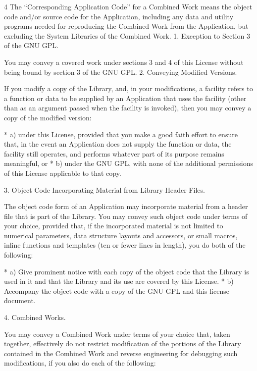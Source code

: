\documentclass[fontsize=11pt,paper=A4,BCOR=12mm,DIV=13,open=any,listof=totoc,toc=flat]{scrbook}
\begin{document}
{\begin{multicols}{4}
The “Corresponding Application Code” for a Combined Work means the object code and/or source code for the Application, including any data and utility programs needed for reproducing the Combined Work from the Application, but excluding the System Libraries of the Combined Work.
1. Exception to Section 3 of the GNU GPL.

You may convey a covered work under sections 3 and 4 of this License without being bound by section 3 of the GNU GPL.
2. Conveying Modified Versions.

If you modify a copy of the Library, and, in your modifications, a facility refers to a function or data to be supplied by an Application that uses the facility (other than as an argument passed when the facility is invoked), then you may convey a copy of the modified version:

    * a) under this License, provided that you make a good faith effort to ensure that, in the event an Application does not supply the function or data, the facility still operates, and performs whatever part of its purpose remains meaningful, or
    * b) under the GNU GPL, with none of the additional permissions of this License applicable to that copy.

3. Object Code Incorporating Material from Library Header Files.

The object code form of an Application may incorporate material from a header file that is part of the Library. You may convey such object code under terms of your choice, provided that, if the incorporated material is not limited to numerical parameters, data structure layouts and accessors, or small macros, inline functions and templates (ten or fewer lines in length), you do both of the following:

    * a) Give prominent notice with each copy of the object code that the Library is used in it and that the Library and its use are covered by this License.
    * b) Accompany the object code with a copy of the GNU GPL and this license document.

4. Combined Works.

You may convey a Combined Work under terms of your choice that, taken together, effectively do not restrict modification of the portions of the Library contained in the Combined Work and reverse engineering for debugging such modifications, if you also do each of the following:


\end{multicols}}
\end{document}
